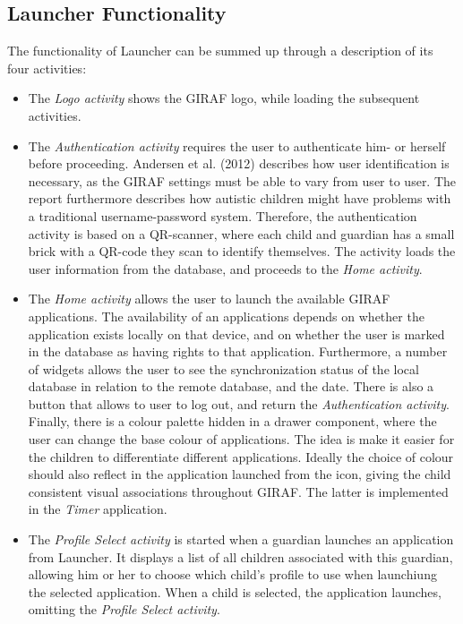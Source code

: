 \subsection{Launcher Functionality}
The functionality of Launcher can be summed up through a description of its four activities:
\begin{itemize}
	\item The \textit{Logo activity} shows the GIRAF logo, while loading the subsequent activities.
	\item The \textit{Authentication activity} requires the user to authenticate him- or herself before proceeding. 
	Andersen et al. (2012) describes how user identification is necessary, as the GIRAF settings must be able to vary from user to user. 
	The report furthermore describes how autistic children might have problems with a traditional username-password system. 
	Therefore, the authentication activity is based on a QR-scanner, where each child and guardian has a small brick with a QR-code they scan to identify 		  	themselves. 
	The activity loads the user information from the database, and proceeds to the \textit{Home activity}.
	\item The \textit{Home activity} allows the user to launch the available GIRAF applications. 
	The availability of an applications depends on whether the application exists locally on that device, and on whether the user is marked in the database as 	having rights to that application. 
	Furthermore, a number of widgets allows the user to see the synchronization status of the local database in relation to the remote database, and the 	 	date. 
	There is also a button that allows to user to log out, and return the \textit{Authentication activity}. 
	Finally, there is a colour palette hidden in a drawer component, where the user can change the base colour of applications. 
	The idea is make it easier for the children to differentiate different applications. 
	Ideally the choice of colour should also reflect in the application launched from the icon, giving the child consistent visual associations throughout GIRAF.
	The latter is implemented in the \textit{Timer} application.
	\item The \textit{Profile Select activity} is started when a guardian launches an application from Launcher. 
	It displays a list of all children associated with this guardian, allowing him or her to choose which child's profile to use when launchiung the selected 	 		 	application. 
	When a child is selected, the application launches, omitting the \textit{Profile Select activity}.
\end{itemize}


